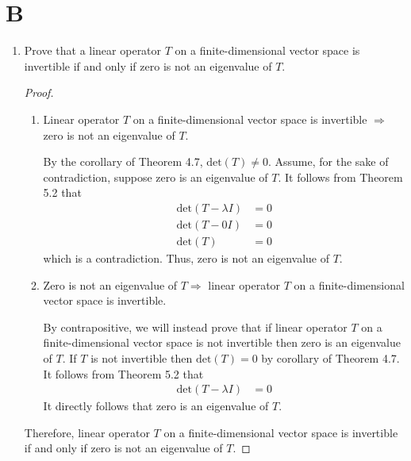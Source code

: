 \documentclass[11pt]{scrartcl}
\begin{document}
\section{B}
\begin{enumerate}[label=\alph*.]
	\item{
	      Prove that a linear operator $T$ on a finite-dimensional vector space is invertible if and only if zero is not an
	      eigenvalue of $T$.
	      \begin{proof}\
		      \begin{enumerate}[label=\roman*.]
			      \item{
			            Linear operator $T$ on a finite-dimensional vector space is invertible $\Rightarrow$ zero is not an
			            eigenvalue of $T$.\par
			            By the corollary of Theorem 4.7, $\text{det}(T) \neq 0$. Assume, for the sake of contradiction, suppose
			            zero is an eigenvalue of $T$.
			            It follows from Theorem 5.2 that
			            \begin{align*}
				            \text{det}(T - \lambda I) & = 0 \\
				            \text{det}(T - 0I)        & = 0 \\
				            \text{det}(T)             & = 0
			            \end{align*}
			            which is a contradiction. Thus, zero is not an eigenvalue of $T$.
			            }
			      \item{
			            Zero is not an eigenvalue of $T\Rightarrow$ linear operator $T$ on a finite-dimensional vector space is invertible.\par
			            By contrapositive, we will instead prove that if linear operator $T$ on a finite-dimensional vector space is not invertible
			            then zero is an eigenvalue of $T$. If $T$ is not invertible then $\text{det}(T) = 0$ by corollary of Theorem 4.7.
			            It follows from Theorem 5.2 that
			            \begin{align*}
				            \text{det}(T - \lambda I) & = 0
			            \end{align*}
			            It directly follows that zero is an eigenvalue of $T$.
			            }
		      \end{enumerate}
		      Therefore, linear operator $T$ on a finite-dimensional vector space is invertible if and only if zero is not an
		      eigenvalue of $T$.
	      \end{proof}
}
\end{enumerate}
\end{document}
